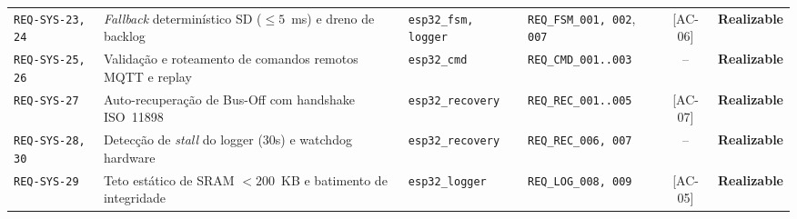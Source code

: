 \begin{table}[htbp]
\begin{tabularx}{\textwidth}{@{} l >{\raggedright\arraybackslash}X l >{\raggedright\arraybackslash}p{3.2cm} c c @{}}
\texttt{REQ-SYS-23, 24} & \textit{Fallback} determinístico SD ($\le 5$~ms) e dreno de backlog & \texttt{esp32\_fsm, logger} & \texttt{REQ\_FSM\_001, 002}, \texttt{007} & [AC-06] & \textbf{Realizable} \\
\texttt{REQ-SYS-25, 26} & Validação e roteamento de comandos remotos MQTT e replay & \texttt{esp32\_cmd} & \texttt{REQ\_CMD\_001..003} & -- & \textbf{Realizable} \\
\texttt{REQ-SYS-27}     & Auto-recuperação de Bus-Off com handshake ISO~11898 & \texttt{esp32\_recovery} & \texttt{REQ\_REC\_001..005} & [AC-07] & \textbf{Realizable} \\
\texttt{REQ-SYS-28, 30} & Detecção de \textit{stall} do logger (30s) e watchdog hardware & \texttt{esp32\_recovery} & \texttt{REQ\_REC\_006, 007} & -- & \textbf{Realizable} \\
\texttt{REQ-SYS-29}     & Teto estático de SRAM $< 200$~KB e batimento de integridade & \texttt{esp32\_logger} & \texttt{REQ\_LOG\_008, 009} & [AC-05] & \textbf{Realizable} \\
\bottomrule
\end{tabularx}
\end{table}
